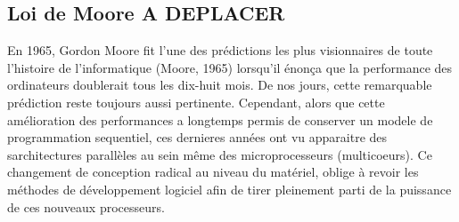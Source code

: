 \cite{Ste95}


\subsection{Loi de Moore A DEPLACER}
En 1965, Gordon Moore fit l'une des prédictions les plus visionnaires de toute l'histoire de l'informatique (Moore, 1965) lorsqu'il énonça que la performance des ordinateurs doublerait tous les dix-huit mois. De nos jours, cette remarquable prédiction reste toujours aussi pertinente. Cependant, alors que cette amélioration des performances a longtemps permis de conserver un modele de programmation sequentiel, ces dernieres années ont vu apparaitre des sarchitectures parallèles au sein même des microprocesseurs (multicoeurs). Ce changement de conception radical au niveau du matériel, oblige à revoir les méthodes de développement logiciel afin de tirer pleinement parti de la puissance de ces nouveaux processeurs.

